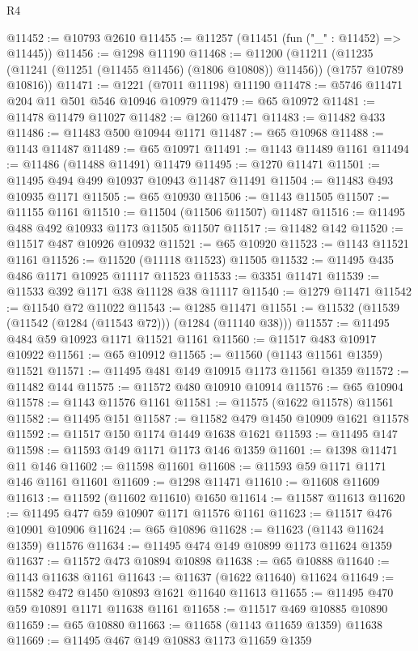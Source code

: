 \begin{lexlean}{R4}
\begin{coremodule}
@11452 := @10793 @2610
@11455 := @11257 (@11451 (fun ("_" : @11452) => @11445))
@11456 := @1298 @11190
@11468 := @11200
    (@11211 (@11235 (@11241 (@11251 (@11455 @11456) (@1806 @10808)) @11456)) (@1757 @10789 @10816))
@11471 := @1221 (@7011 @11198) @11190
@11478 := @5746 @11471 @204 @11 @501 @546 @10946 @10979
@11479 := @65 @10972
@11481 := @11478 @11479 @11027
@11482 := @1260 @11471
@11483 := @11482 @433
@11486 := @11483 @500 @10944 @1171
@11487 := @65 @10968
@11488 := @1143 @11487
@11489 := @65 @10971
@11491 := @1143 @11489 @1161
@11494 := @11486 (@11488 @11491) @11479
@11495 := @1270 @11471
@11501 := @11495 @494 @499 @10937 @10943 @11487 @11491
@11504 := @11483 @493 @10935 @1171
@11505 := @65 @10930
@11506 := @1143 @11505
@11507 := @11155 @1161
@11510 := @11504 (@11506 @11507) @11487
@11516 := @11495 @488 @492 @10933 @1173 @11505 @11507
@11517 := @11482 @142
@11520 := @11517 @487 @10926 @10932
@11521 := @65 @10920
@11523 := @1143 @11521 @1161
@11526 := @11520 (@11118 @11523) @11505
@11532 := @11495 @435 @486 @1171 @10925 @11117 @11523
@11533 := @3351 @11471
@11539 := @11533 @392 @1171 @38 @11128 @38 @11117
@11540 := @1279 @11471
@11542 := @11540 @72 @11022
@11543 := @1285 @11471
@11551 := @11532 (@11539 (@11542 (@1284 (@11543 @72))) (@1284 (@11140 @38)))
@11557 := @11495 @484 @59 @10923 @1171 @11521 @1161
@11560 := @11517 @483 @10917 @10922
@11561 := @65 @10912
@11565 := @11560 (@1143 @11561 @1359) @11521
@11571 := @11495 @481 @149 @10915 @1173 @11561 @1359
@11572 := @11482 @144
@11575 := @11572 @480 @10910 @10914
@11576 := @65 @10904
@11578 := @1143 @11576 @1161
@11581 := @11575 (@1622 @11578) @11561
@11582 := @11495 @151
@11587 := @11582 @479 @1450 @10909 @1621 @11578
@11592 := @11517 @150 @1174 @1449 @1638 @1621
@11593 := @11495 @147
@11598 := @11593 @149 @1171 @1173 @146 @1359
@11601 := @1398 @11471 @11 @146
@11602 := @11598 @11601
@11608 := @11593 @59 @1171 @1171 @146 @1161 @11601
@11609 := @1298 @11471
@11610 := @11608 @11609
@11613 := @11592 (@11602 @11610) @1650
@11614 := @11587 @11613
@11620 := @11495 @477 @59 @10907 @1171 @11576 @1161
@11623 := @11517 @476 @10901 @10906
@11624 := @65 @10896
@11628 := @11623 (@1143 @11624 @1359) @11576
@11634 := @11495 @474 @149 @10899 @1173 @11624 @1359
@11637 := @11572 @473 @10894 @10898
@11638 := @65 @10888
@11640 := @1143 @11638 @1161
@11643 := @11637 (@1622 @11640) @11624
@11649 := @11582 @472 @1450 @10893 @1621 @11640 @11613
@11655 := @11495 @470 @59 @10891 @1171 @11638 @1161
@11658 := @11517 @469 @10885 @10890
@11659 := @65 @10880
@11663 := @11658 (@1143 @11659 @1359) @11638
@11669 := @11495 @467 @149 @10883 @1173 @11659 @1359

\end{coremodule}
\end{lexlean}
